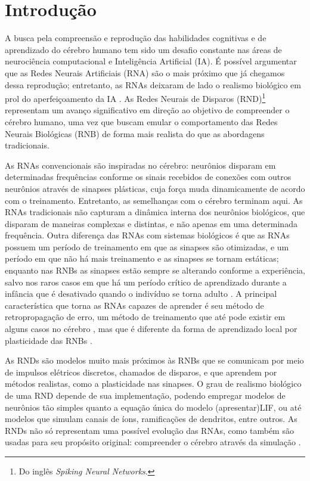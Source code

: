 \chapter{Introdução}

A busca pela compreensão e reprodução das habilidades cognitivas e de aprendizado do cérebro humano tem sido um desafio constante
nas áreas de neurociência computacional e Inteligência Artificial (IA). É possível argumentar que as Redes Neurais Artificiais
(RNA) são o mais próximo que já chegamos dessa reprodução; entretanto, as RNAs deixaram de lado o realismo biológico em prol do
aperfeiçoamento da IA \cite{}. As Redes Neurais de Disparos (RND)\footnote{Do inglês \textit{Spiking Neural Networks}.} representam um
avanço significativo em direção ao objetivo de compreender o cérebro humano, uma vez que buscam emular o comportamento das Redes
Neurais Biológicas (RNB) de forma mais realista do que as abordagens tradicionais.

As RNAs convencionais são inspiradas no cérebro: neurônios disparam em determinadas frequências conforme os sinais recebidos de
conexões com outros neurônios através de sinapses plásticas, cuja força muda dinamicamente de acordo com o treinamento.
Entretanto, as semelhanças com o cérebro terminam aqui. As RNAs tradicionais não capturam a dinâmica interna dos neurônios
biológicos, que disparam de maneiras complexas e distintas, e não apenas em uma determinada frequência. Outra diferença das RNAs
com sistemas biológicos é que as RNAs possuem um período de treinamento em que as sinapses são otimizadas, e um período em que não
há mais treinamento e as sinapses se tornam estáticas; enquanto nas RNBs as sinapses estão sempre se alterando conforme a
experiência, salvo nos raros casos em que há um período crítico de aprendizado durante a infância que é desativado quando o
indivíduo se torna adulto \cite{crepelRegression1982}. A principal característica que torna as RNAs capazes de aprender é seu
método de retropropagação de erro, um método de treinamento que até pode existir em alguns casos no cérebro
\cite{lillicrapBackpropagation2020; songCan2020}, mas que é diferente da forma de aprendizado local por plasticidade das
RNBs \cite{yamazakiSpiking2022}.

As RNDs são modelos muito mais próximos às RNBs que se comunicam por meio de impulsos elétricos discretos, chamados de disparos, e
que aprendem por métodos realistas, como a plasticidade nas sinapses. O grau de realismo biológico de uma RND depende de sua
implementação, podendo empregar modelos de neurônios tão simples quanto a equação única do modelo (apresentar)LIF, ou até modelos
que simulam canais de íons, ramificações de dendritos, entre outros. As RNDs não só representam uma possível evolução das RNAs,
como também são usadas para seu propósito original: compreender o cérebro através da simulação \cite{}.

